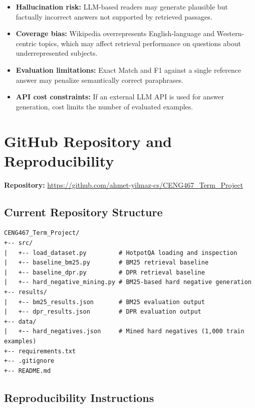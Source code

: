 \documentclass[12pt,a4paper]{article}
\begin{document}
\begin{itemize}[noitemsep]
    \item \textbf{Hallucination risk:} LLM-based readers may generate plausible but
          factually incorrect answers not supported by retrieved passages.
    \item \textbf{Coverage bias:} Wikipedia overrepresents English-language and
          Western-centric topics, which may affect retrieval performance on questions
          about underrepresented subjects.
    \item \textbf{Evaluation limitations:} Exact Match and F1 against a single reference
          answer may penalize semantically correct paraphrases.
    \item \textbf{API cost constraints:} If an external LLM API is used for answer
          generation, cost limits the number of evaluated examples.
\end{itemize}

\section{GitHub Repository and Reproducibility}

\textbf{Repository:}
\url{https://github.com/ahmet-yilmaz-cs/CENG467_Term_Project}

\subsection*{Current Repository Structure}

\begin{lstlisting}
CENG467_Term_Project/
+-- src/
|   +-- load_dataset.py         # HotpotQA loading and inspection
|   +-- baseline_bm25.py        # BM25 retrieval baseline
|   +-- baseline_dpr.py         # DPR retrieval baseline
|   +-- hard_negative_mining.py # BM25-based hard negative generation
+-- results/
|   +-- bm25_results.json       # BM25 evaluation output
|   +-- dpr_results.json        # DPR evaluation output
+-- data/
|   +-- hard_negatives.json     # Mined hard negatives (1,000 train examples)
+-- requirements.txt
+-- .gitignore
+-- README.md
\end{lstlisting}

\subsection*{Reproducibility Instructions}
\end{document}
